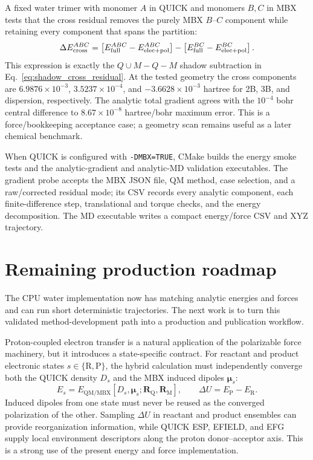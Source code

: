 \documentclass[11pt]{article}
\begin{document}
A fixed water trimer with monomer $A$ in QUICK and monomers $B,C$ in MBX
tests that the cross residual removes the purely MBX $B$--$C$ component
while retaining every component that spans the partition:
\begin{equation}
  \Delta E_{\rm cross}^{ABC}
  =
  \left[
    E_{\rm full}^{ABC}-E_{\rm elec+pol}^{ABC}
  \right]
  -
  \left[
    E_{\rm full}^{BC}-E_{\rm elec+pol}^{BC}
  \right].
\end{equation}
This expression is exactly the $Q\cup M-Q-M$ shadow subtraction in
Eq.~\ref{eq:shadow_cross_residual}. At the tested geometry the cross
components are $6.9876\times10^{-3}$, $3.5237\times10^{-4}$, and
$-3.6628\times10^{-3}$ hartree for 2B, 3B, and dispersion, respectively.
The analytic total gradient agrees with the $10^{-4}$ bohr central
difference to $8.67\times10^{-8}$ hartree/bohr maximum error. This is a
force/bookkeeping acceptance case; a geometry scan remains useful as a
later chemical benchmark.

When QUICK is configured with \texttt{-DMBX=TRUE}, CMake builds the
energy smoke tests and the analytic-gradient and analytic-MD validation
executables. The gradient probe accepts the MBX JSON file, QM method, case
selection, and a raw/corrected residual mode; its CSV records every
analytic component, each finite-difference step, translational and torque
checks, and the energy decomposition. The MD executable writes a compact
energy/force CSV and XYZ trajectory.

\section{Remaining production roadmap}

The CPU water implementation now has matching analytic energies and
forces and can run short deterministic trajectories. The next work is to
turn this validated method-development path into a production and
publication workflow.

Proton-coupled electron transfer is a natural application of the
polarizable force machinery, but it introduces a state-specific contract.
For reactant and product electronic states
\(s\in\{\mathrm R,\mathrm P\}\), the hybrid calculation must independently
converge both the QUICK density \(D_s\) and the MBX induced dipoles
\(\boldsymbol\mu_s\):
\begin{equation}
  E_s
  =E_{\mathrm{QM/MBX}}[D_s,\boldsymbol\mu_s;
    \mathbf R_{\mathrm Q},\mathbf R_{\mathrm M}],
  \qquad
  \Delta U=E_{\mathrm P}-E_{\mathrm R}.
\end{equation}
Induced dipoles from one state must never be reused as the converged
polarization of the other. Sampling \(\Delta U\) in reactant and product
ensembles can provide reorganization information, while QUICK ESP,
EFIELD, and EFG supply local environment descriptors along the proton
donor--acceptor axis. This is a strong use of the present energy and force
implementation.
\end{document}
